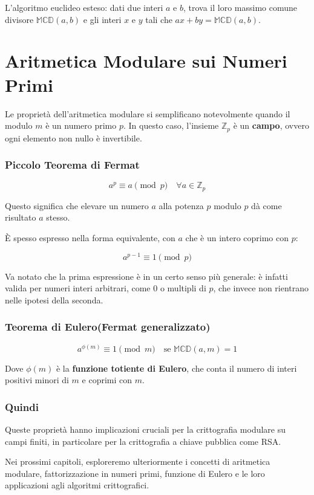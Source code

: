 \documentclass[a4paper,12pt]{report}
\begin{document}
L'algoritmo euclideo esteso: dati due interi $a$ e $b$, trova il loro massimo comune divisore $\mathbb{MCD}(a,b)$ e gli interi $x$ e $y$ tali che $ax + by = \mathbb{MCD}(a,b)$.

\section{Aritmetica Modulare sui Numeri Primi}

Le proprietà dell'aritmetica modulare si semplificano notevolmente quando il modulo $m$ è un numero primo $p$. In questo caso, l'insieme $\mathbb{Z}_p$ è un \textbf{campo}, ovvero ogni elemento non nullo è invertibile.

\subsubsection*{Piccolo Teorema di Fermat}

$$a^p \equiv a \pmod{p} \quad \forall a \in \mathbb{Z}_p$$

Questo significa che elevare un numero $a$ alla potenza $p$ modulo $p$ dà come risultato $a$ stesso.

È spesso espresso nella forma equivalente, con \(a\) che è un intero coprimo con \(p\):

\[a^{p-1} \equiv 1 \pmod{p}\]

Va notato che la prima espressione è in un certo senso più generale: è infatti valida per numeri interi arbitrari, come \(0\) o multipli di \(p\), che invece non rientrano nelle ipotesi della seconda.

\subsubsection*{Teorema di Eulero(Fermat generalizzato)}

$$a^{\phi(m)} \equiv 1 \pmod{m} \quad \text{se } \mathbb{MCD}(a,m) = 1$$

Dove $\phi(m)$ è la \textbf{funzione totiente di Eulero}, che conta il numero di interi positivi minori di $m$ e coprimi con $m$.

\subsubsection*{Quindi}
Queste proprietà hanno implicazioni cruciali per la crittografia modulare su campi finiti, in particolare per la crittografia a chiave pubblica come RSA.

Nei prossimi capitoli, esploreremo ulteriormente i concetti di aritmetica modulare, fattorizzazione in numeri primi, funzione di Eulero e le loro applicazioni agli algoritmi crittografici.
%
%
%
\end{document}
